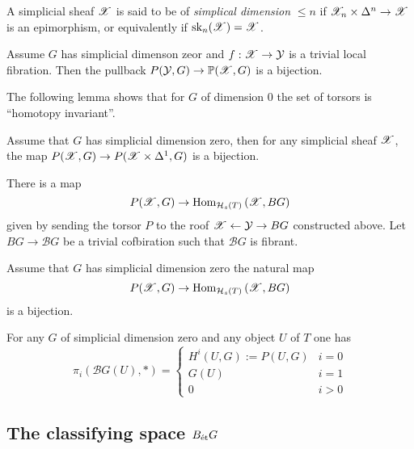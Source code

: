 \documentclass[12pt]{article}
\begin{document}
\begin{defn}
A simplicial sheaf $\mathscr{X}$ is said to be of \textit{simplical dimension} $\le n$ if $\mathscr{X}_n \times \Delta^n \to \mathscr{X}$ is an epimorphism, or equivalently if $\operatorname{\mathrm{sk}}_n(\mathscr{X}) = \mathscr{X}$. 
\end{defn}

\begin{lemma}
Assume $G$ has simplicial dimenson zeor and $f : \mathscr{X} \to \mathcal{Y}$ is a trivial local fibration. Then the pullback $P(\mathcal{Y}, G) \to \mathbb{P}(\mathscr{X}, G)$ is a bijection.
\end{lemma}

The following lemma shows that for $G$ of dimension $0$ the set of torsors is ``homotopy invariant''.

\begin{lemma}
Assume that $G$ has simplicial dimension zero, then for any simplicial sheaf $\mathscr{X}$, the map $P(\mathscr{X}, G) \to P(\mathscr{X} \times \Delta^1, G)$ is a bijection. 
\end{lemma}

There is a map
\[ P(\mathscr{X}, G) \to \mathrm{Hom}_{\mathcal{H}_s(T)} \left( \mathscr{X}, BG \right) \]
given by sending the torsor $P$ to the roof $\mathscr{X} \leftarrow \mathcal{Y} \to BG$ constructed above. Let $BG \to \mathcal{B} G$ be a trivial cofbiration such that $\mathcal{B} G$ is fibrant.

\begin{lemma}
Assume that $G$ has simplicial dimension zero the natural map
\[ P(\mathscr{X}, G) \to \mathrm{Hom}_{\mathcal{H}_s(T)} \left( \mathscr{X}, BG \right) \]
is a bijection. 
\end{lemma}

\begin{prop}
For any $G$ of simplicial dimension zero and any object $U$ of $T$ one has
\[ \pi_i(\mathcal{B} G(U), *) = 
\begin{cases}
H^i(U, G) := P(U, G) &  i = 0
\\
G(U) & i = 1
\\
0 & i > 0
\end{cases} \]
\end{prop}

\subsection{The \etale classifying space $B_{\text{\'{e}t}} G$}
\end{document}
